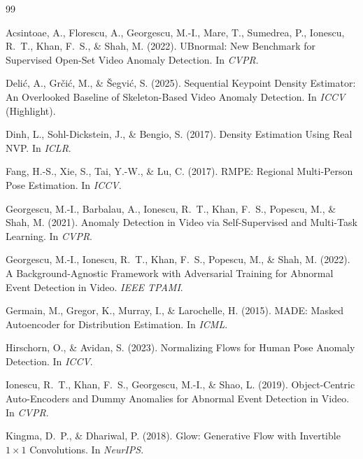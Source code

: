 \documentclass{article}
\begin{document}

\begin{thebibliography}{99}

Acsintoae, A., Florescu, A., Georgescu, M.-I., Mare, T., Sumedrea, P.,
Ionescu, R.~T., Khan, F.~S., \& Shah, M. (2022).
\newblock UBnormal: New Benchmark for Supervised Open-Set Video Anomaly Detection.
In {\em CVPR}.

Deli{\'c}, A., Gr{\v c}i{\'c}, M., \& {\v S}egvi{\'c}, S. (2025).
\newblock Sequential Keypoint Density Estimator: An Overlooked Baseline of
Skeleton-Based Video Anomaly Detection.
\newblock In {\em ICCV} (Highlight).

Dinh, L., Sohl-Dickstein, J., \& Bengio, S. (2017).
Density Estimation Using Real NVP. In {\em ICLR}.

Fang, H.-S., Xie, S., Tai, Y.-W., \& Lu, C. (2017).
\newblock RMPE: Regional Multi-Person Pose Estimation.
In {\em ICCV}.

Georgescu, M.-I., Barbalau, A., Ionescu, R.~T., Khan, F.~S., Popescu, M., \&
Shah, M. (2021).
\newblock Anomaly Detection in Video via Self-Supervised and Multi-Task Learning.
In {\em CVPR}.

Georgescu, M.-I., Ionescu, R.~T., Khan, F.~S., Popescu, M., \& Shah, M. (2022).
\newblock A Background-Agnostic Framework with Adversarial Training for Abnormal Event Detection in Video.
{\em IEEE TPAMI}.

Germain, M., Gregor, K., Murray, I., \& Larochelle, H. (2015).
\newblock MADE: Masked Autoencoder for Distribution Estimation.
In {\em ICML}.

Hirschorn, O., \& Avidan, S. (2023).
\newblock Normalizing Flows for Human Pose Anomaly Detection.
In {\em ICCV}.

Ionescu, R.~T., Khan, F.~S., Georgescu, M.-I., \& Shao, L. (2019).
\newblock Object-Centric Auto-Encoders and Dummy Anomalies for Abnormal
Event Detection in Video.
In {\em CVPR}.

Kingma, D.~P., \& Dhariwal, P. (2018).
\newblock Glow: Generative Flow with Invertible $1{\times}1$ Convolutions.
In {\em NeurIPS}.


\end{thebibliography}
\end{document}
